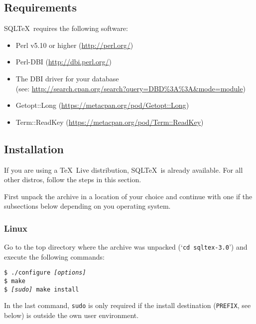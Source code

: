 \documentclass{article}
\newcommand{\vs}{\vspace{3mm}}
\newcommand{\sqltexversion}{3.0}
\begin{document}
\subsection{Requirements}

SQL\TeX\ requires the following software:

\begin{itemize}
\item Perl v5.10 or higher (\url{http://perl.org/})
\item Perl-DBI      (\url{http://dbi.perl.org/})
\item The DBI driver for your database\\(see: \url{http://search.cpan.org/search?query=DBD\%3A\%3A\&mode=module})
\item Getopt::Long   (\url{https://metacpan.org/pod/Getopt::Long})
\item Term::ReadKey (\url{https://metacpan.org/pod/Term::ReadKey})
\end{itemize}

\subsection{Installation}

If you are using a \TeX\ Live distribution, SQL\TeX\ is already available. For all other distros, follow the steps in this section.

\vs 

First unpack the archive in a location of your choice and continue with one if the subsections below depending on you operating system.

\subsubsection{Linux}

Go to the top directory where the archive was unpacked (`\texttt{cd sqltex-\sqltexversion}') and execute the following commands:

\vs

\noindent\texttt{\$ ./configure \textit{[options]}\\
\$ make \\
\$ \textit{[sudo] }make install}

\vs

In the last command, \texttt{sudo} is only required if the install destination (\texttt{PREFIX}, see below) is outside the own user environment.

\vs
\end{document}
